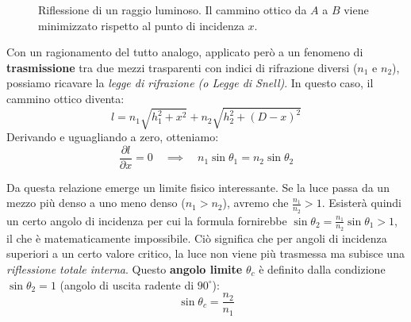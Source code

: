 \documentclass[openany,a4paper,12pt]{book}
\begin{document}
\begin{figure}[H]
\centering
{}
\caption{Riflessione di un raggio luminoso. Il cammino ottico da $A$ a $B$ viene minimizzato rispetto al punto di incidenza $x$.}
\end{figure}

Con un ragionamento del tutto analogo, applicato però a un fenomeno di \textbf{trasmissione} tra due mezzi trasparenti con indici di rifrazione diversi ($n_1$ e $n_2$), possiamo ricavare la \textit{legge di rifrazione (o Legge di Snell)}. In questo caso, il cammino ottico diventa:
\begin{equation}
    l = n_1 \sqrt{h_1^2 + x^2} + n_2 \sqrt{h_2^2 + (D-x)^2}
\end{equation}
Derivando e uguagliando a zero, otteniamo:
\begin{equation}
    \frac{\partial l}{\partial x} = 0  \quad \implies \quad n_1 \sin \theta_1 = n_2 \sin \theta_2
\end{equation}

Da questa relazione emerge un limite fisico interessante. Se la luce passa da un mezzo più denso a uno meno denso ($n_1 > n_2$), avremo che $\frac{n_1}{n_2} > 1$. Esisterà quindi un certo angolo di incidenza per cui la formula fornirebbe $\sin \theta_2 = \frac{n_1}{n_2} \sin \theta_1 > 1$, il che è matematicamente impossibile. 
Ciò significa che per angoli di incidenza superiori a un certo valore critico, la luce non viene più trasmessa ma subisce una \textit{riflessione totale interna}. Questo \textbf{angolo limite} $\theta_c$ è definito dalla condizione $\sin \theta_2 = 1$ (angolo di uscita radente di $90^\circ$):
\begin{equation}
    \sin \theta_c = \frac{n_2}{n_1}
\end{equation}
\end{document}
